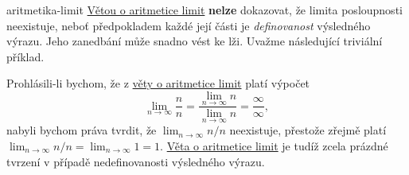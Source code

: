 \begin{warning}{}{aritmetika-limit}
 \hyperref[thm:aritmetika-limit]{Větou o aritmetice limit} \textbf{nelze}
 dokazovat, že limita posloupnosti neexistuje, neboť předpokladem každé její
 části je \emph{definovanost} výsledného výrazu. Jeho zanedbání může snadno vést
 ke lži. Uvažme následující triviální příklad.

 Prohlásili-li bychom, že z \hyperref[thm:aritmetika-limit]{věty o aritmetice
 limit} platí výpočet
 \[
  \lim_{n \to \infty} \frac{n}{n} = \frac{\lim_{n \to \infty} n}{\lim_{n \to
  \infty} n} = \frac{\infty}{\infty},
 \]
 nabyli bychom práva tvrdit, že $\lim_{n \to \infty} n / n$ neexistuje, přestože
 zřejmě platí $\lim_{n \to \infty} n / n = \lim_{n \to \infty} 1 = 1$.
 \hyperref[thm:aritmetika-limit]{Věta o aritmetice limit} je tudíž zcela prázdné
 tvrzení v případě nedefinovanosti výsledného výrazu.
\end{warning}


